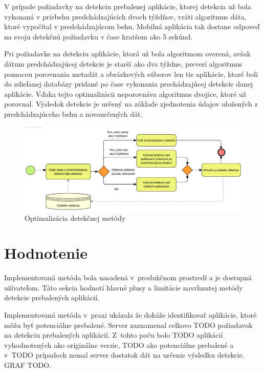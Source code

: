 V prípade požiadavky na detekciu prebalenej aplikácie, ktorej detekcia už bola vykonaná v priebehu predchádzajúcich dvoch týždňov, vráti algoritmus dáta, ktoré vypočítal v predchádzajúcom behu. Mobilná aplikácia tak dostane odpoveď na svoju detekčnú požiadavku v čase kratšom ako 5 sekúnd.

Pri požiadavke na detekciu aplikácie, ktorá už bola algoritmom overená, avšak dátum predchádzajúcej detekcie je starší ako dva týždne, preverí algoritmus pomocou porovnania metadát a obrázkových súborov len tie aplikácie, ktoré boli do zdieľanej databázy pridané po čase vykonania prechádzajúcej detekcie danej aplikácie. Vďaka tejto optimalizácii neporovnáva algoritmus dvojice, ktoré už porovnal. Výsledok detekcie je určený na základe zjednotenia údajov  uložených z predchádzajúceho behu a novourčených dát. 

\begin{figure}[htb]
  \begin{center}
    \includegraphics[width=130mm]{images/detection-optimalization.png}
  \end{center}
  \caption{Optimalizácia detekčnej metódy}
  \label{fig:detectionOriginal}
\end{figure}

\section{Hodnotenie}
\label{sec:hodnotenie}
Implementovaná metóda bola nasadená v~produkčnom prostredí a je dostupná užívateľom. Táto sekcia hodnotí hlavné plusy a limitácie navrhnutej metódy detekcie prebalených aplikácií.

Implementovaná metóda v~praxi ukázala že dokáže identifikovať aplikácie, ktoré môžu byť potenciálne prebalené. Server zaznamenal celkovo TODO požiadavok na detekciu prebalených aplikácií. Z~tohto poču bolo TODO aplikácií vyhodnotených ako originálne verzie, TODO ako potenciálne prebalené a v~TODO prípadoch nemal server dostatok dát na určenie výsledku detekcie. GRAF TODO.

